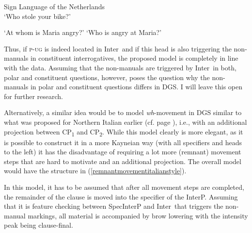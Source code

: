 \newpage
\begin{exe}
\ex Sign Language of the Netherlands \citep[111]{aboh2010sa} \\ 
\glt `Who stole your bike?' \label{ex:abohpfaupug}

\ex\label{pugdgs}
\begin{xlist}
\ex {}
\glt `At whom is Maria angry?' \label{ex:pugdgsa}
\ex {}
\glt `Who is angry at Maria?' \label{ex:pugdgsb}
\end{xlist}
\end{exe}

\noindent Thus, if \textsc{p-ug} is indeed located in Inter\textdegree\ and if this head is also triggering the non-manuals in constituent interrogatives, the proposed model is completely in line with the data. Assuming that the non-manuals are triggered by Inter\textdegree\ in both, polar and constituent questions, however, poses the question why the non-manuals in polar and constituent questions differs in DGS. I will leave this open for further research.   %

Alternatively, a similar idea would be to model \textit{wh}-movement in DGS similar to what was proposed for Northern Italian earlier (cf. page \pageref{italianwhdoublinga}), i.e., with an additional projection between CP\textsubscript{1} and CP\textsubscript{2}. While this model clearly is more elegant, as it is possible to construct it in a more Kayneian way (with all specifiers and heads to the left) it has the disadvantage of requiring a lot more (remnant) movement steps that are hard to motivate and an additional projection. The overall model would have the structure in (\ref{remnantmovementitalianstyle}).%

In this model, it has to be assumed that after all movement steps are completed, the remainder of the clause is moved into the specifier of the InterP. Assuming that it is feature checking between SpecInterP and Inter\textdegree\ that triggers the non-manual markings, all material is accompanied by brow lowering with the intensity peak being clause-final.

